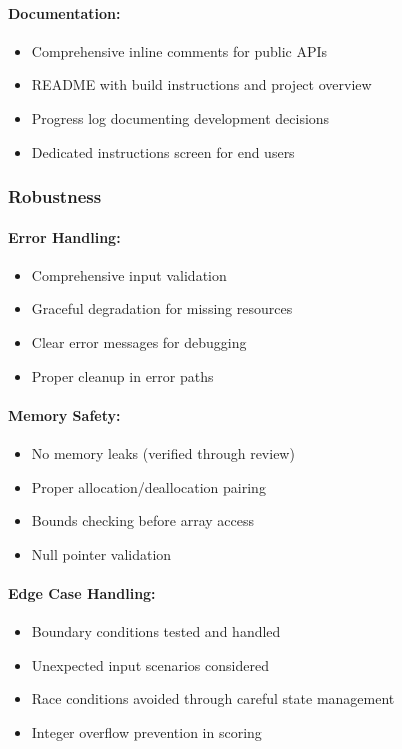 \documentclass[12pt,a4paper]{article}
\begin{document}
\paragraph{Documentation:}
\begin{itemize}
    \item Comprehensive inline comments for public APIs
    \item README with build instructions and project overview
    \item Progress log documenting development decisions
    \item Dedicated instructions screen for end users
\end{itemize}

\subsubsection{Robustness}

\paragraph{Error Handling:}
\begin{itemize}
    \item Comprehensive input validation
    \item Graceful degradation for missing resources
    \item Clear error messages for debugging
    \item Proper cleanup in error paths
\end{itemize}

\paragraph{Memory Safety:}
\begin{itemize}
    \item No memory leaks (verified through review)
    \item Proper allocation/deallocation pairing
    \item Bounds checking before array access
    \item Null pointer validation
\end{itemize}

\paragraph{Edge Case Handling:}
\begin{itemize}
    \item Boundary conditions tested and handled
    \item Unexpected input scenarios considered
    \item Race conditions avoided through careful state management
    \item Integer overflow prevention in scoring
\end{itemize}
\end{document}

